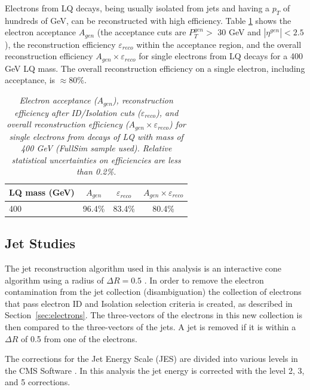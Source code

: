 \documentclass{cmspaper}
\begin{document}
\begin{linenumbers}
Electrons from LQ decays, being usually isolated from jets and having a $p_{T}$ of 
hundreds of GeV, can be reconstructed with high efficiency. 
Table \ref{tab:ElecEffAcc} 
shows the electron acceptance $A_{gen}$ (the acceptance cuts are $P_{T}^{gen}>$ 30 GeV 
and $|\eta^{gen}|<2.5$), the reconstruction efficiency $\varepsilon_{reco}$ within the acceptance 
region, and the overall reconstruction efficiency $A_{gen} \times \varepsilon_{reco}$ 
for single electrons from LQ decays for a 400 GeV LQ mass.
The overall reconstruction efficiency on a single electron, including acceptance, is $\approx 80\%$.
\begin{table}[htb]
  \label{tab:ElecEffAcc}
  \begin{center}
    \begin{tabular}{|l|c|c|c|} \hline
      LQ mass (GeV) & $A_{gen}$ & $\varepsilon_{reco}$ & $A_{gen} \times \varepsilon_{reco}$\\ \hline
      400 & 96.4\% & 83.4\% & 80.4\% \\ \hline
    \end{tabular}
    \caption{\small \sl Electron acceptance ($A_{gen}$), 
      reconstruction efficiency after ID/Isolation cuts ($\varepsilon_{reco}$), and overall reconstruction efficiency 
      ($A_{gen} \times \varepsilon_{reco}$) for single electrons from decays of LQ with mass of 400 GeV (FullSim sample used).   
      Relative statistical uncertainties on efficiencies are less than 0.2\%.  
      } 
  \end{center}
\end{table}

\subsection{Jet Studies} \label{sec:jet}

The jet reconstruction algorithm used in this analysis is an interactive cone algorithm using a radius of $\Delta R=0.5$ \cite{JetAlg}.  
In order to remove the electron contamination from the jet collection (disambiguation)
the collection of electrons that pass electron ID and Isolation 
selection criteria is created, as described in Section~\ref{sec:electrons}. The three-vectors of the 
electrons in this new collection is then compared to the three-vectors of the jets. 
A jet is removed if it is within a $\Delta R$ of 0.5 from one of the electrons. 


The corrections for the Jet Energy Scale (JES) are divided into various levels in the CMS Software \cite{JES}.  
In this analysis the jet energy is corrected with the level 2, 3, and 5 corrections.


\end{linenumbers}
\end{document}
